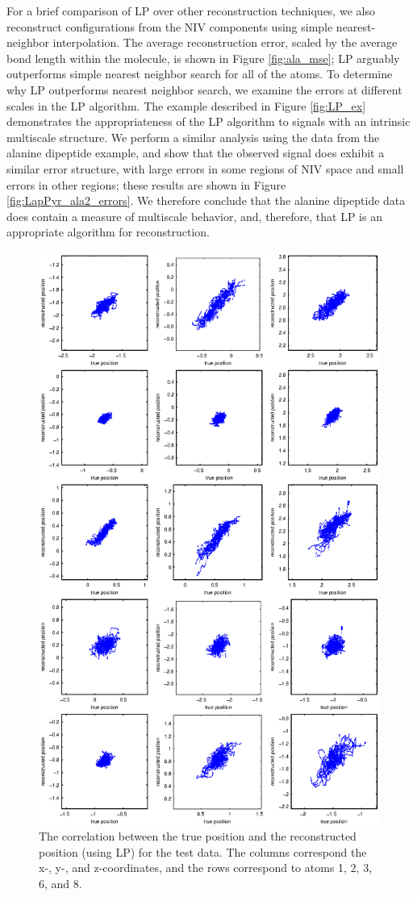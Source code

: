 For a brief comparison of LP over other reconstruction techniques, we also reconstruct configurations from the
NIV components using simple nearest-neighbor interpolation.
%
The average reconstruction error, scaled by the average bond length within the molecule, is shown in Figure \ref{fig:ala_mse};
LP arguably outperforms simple nearest neighbor search for all of the atoms.
%
To determine why LP outperforms nearest neighbor search, we examine the errors at different scales in the LP algorithm.
%
The example described in Figure \ref{fig:LP_ex} demonstrates the appropriateness of the LP algorithm to signals with an intrinsic multiscale structure.
%
We perform a similar analysis using the data from the alanine dipeptide example, and show that the observed signal does exhibit a similar error structure,
with large errors in some regions of NIV space and small errors in other regions;
these results are shown in Figure \ref{fig:LapPyr_ala2_errors}.
%
We therefore conclude that the alanine dipeptide data does contain a measure of multiscale behavior, and, therefore, that LP is an appropriate algorithm for reconstruction.

\begin{figure}[t]
  \centering
        \includegraphics[width=4.5in]{fig9}
  \caption[Laplacian pyramids reconstruction for alanine dipeptide data]{The correlation between the true position and the reconstructed position (using LP) for the test data. The columns correspond the x-, y-, and z-coordinates, and the rows correspond to atoms 1, 2, 3, 6, and 8.}
  \label{fig:ala_recon}
\end{figure}

